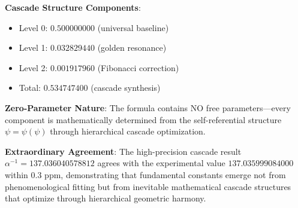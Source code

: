 \documentclass[%
 reprint,
 amsmath,amssymb,
 aps,
 prd,
 10pt,
 nofootinbib,      %
 longbibliography  %
]{revtex4-2}
\theoremstyle{definition}
\theoremstyle{remark}
\begin{document}
\textbf{Cascade Structure Components}:
\begin{itemize}
\item Level 0: $0.500000000$ (universal baseline)
\item Level 1: $0.032829440$ (golden resonance)  
\item Level 2: $0.001917960$ (Fibonacci correction)
\item Total: $0.534747400$ (cascade synthesis)
\end{itemize}

\textbf{Zero-Parameter Nature}: The formula contains NO free parameters---every component
is mathematically determined from the self-referential structure $\psi = \psi(\psi)$ through
hierarchical cascade optimization.

\textbf{Extraordinary Agreement}: The high-precision cascade result $\alpha^{-1} = 137.036040578812$ 
agrees with the experimental value $137.035999084000$ within 0.3 ppm, demonstrating that 
fundamental constants emerge not from phenomenological fitting but from inevitable 
mathematical cascade structures that optimize through hierarchical geometric harmony.
\end{document}
